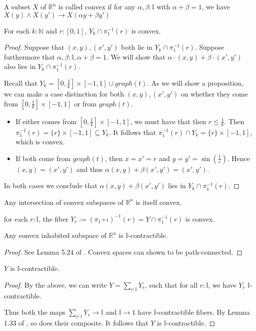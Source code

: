 \documentclass{../util/zariski}
\begin{document}
\begin{definition}
  A subset $X$ of $\mathbb R^n$ is called convex if 
  for any $\alpha,\beta:\mathbb I$ with $\alpha + \beta = 1$, we have 
  $X(y) \wedge X(y') \to X(\alpha y + \beta y')$
\end{definition}
\begin{lemma}
  For each $k:\mathbb N$ and $r:[0,1]$, $Y_k\cap \pi_1^{-1}(r)$ is convex. 
\end{lemma}
\begin{proof}
  Suppose that $(x,y), (x',y')$ both lie in $Y_k\cap \pi_1^{-1}(r)$. 
  Suppose furthermore that $\alpha,\beta:\mathbb I, \alpha+ \beta = 1$. 
  We will show that $\alpha\cdot (x,y) + \beta\cdot (x',y') $ also lies in 
  $Y_k \cap \pi_1^{-1}(r)$. 

  Recall that 
  $Y_k = [0,\frac1k] \times [-1,1]  \cup graph(t)$. 
  As we will show a proposition, we can make a case distinction 
  for both $(x,y), (x',y')$ on whether they come from $[0,\frac 1k] \times [-1,1]$ or 
  from $graph(t)$.
  \begin{itemize}
    \item 
      If either comes from $[0,\frac1k] \times [-1,1]$, we must have that 
      then $r \leq \frac1k$. 
      Then $\pi_1^{-1}(r) = \{r\} \times [-1,1]\subseteq Y_k$. 
      It follows that $\pi_1^{-1}(r) \cap Y_k = \{r\} \times [-1, 1]$, which is convex. 
    \item 
      If both come from $graph(t)$, 
      then $x = x' = r$ and $y = y' = \sin(\frac1r)$. 
      Hence $(x,y) = (x',y')$ and thus $\alpha(x,y) + \beta(x',y') = (x',y')$. 
  \end{itemize}
  In both cases we conclude that $\alpha (x,y) + \beta(x',y')$ lies in 
  $Y_k\cap \pi_1^{-1}(r)$. 
\end{proof}


\begin{remark}
  Any intersection of convex subspaces of $\mathbb R^n$ is itself convex. 
\end{remark}
\begin{corollary}
  for each $r:\mathbb I$, the fiber 
  $Y_r:=(\pi_1\circ \iota)^{-1}(r) = Y\cap \pi_1^{-1}(r)$ is convex. 
\end{corollary}
\begin{lemma}
  Any convex inhabited subspace of $\mathbb R^n$ is $\mathbb I$-contractible. 
\end{lemma} 
\begin{proof}
  See Lemma 5.24 of \cite{synthetic-stone-duality}. 
  Convex spaces can shown to be path-connected.
\end{proof}
\begin{theorem}
  $Y$ is $\mathbb I$-contractible. 
\end{theorem}
\begin{proof}
  By the above, we can write $Y = \sum\limits_{r:\mathbb I} Y_r$, 
  such that for all $r:\mathbb I$, we have 
  $Y_r$ $\mathbb I$-contractible. 

  Thus both the maps $\sum\limits_{r:\mathbb I} Y_r \to \mathbb I$ and 
  $\mathbb I \to 1$ have $\mathbb I$-contractible fibers. 
  By Lemma 1.33 of \cite{modalities}, so does their composite. 
  It follows that $Y$ is $\mathbb I$-contractible. 
\end{proof}
\printbibliography
\end{document}
